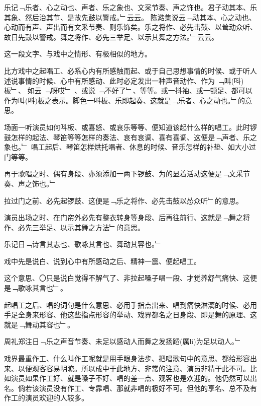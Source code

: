 \documentclass{zhvt-classic}
\begin{document}
\begin{preface}
  乐记﹁乐者、心之动也、声者、乐之象也、文采节奏、声之饰也。君子动其本、乐其象、然后治其节、是故先鼓以警戒。﹂云云。
  陈澔集说云﹁动其本、心之动也、心动而有声、声出而有文釆节奏、则乐饰矣。乐之将作、必先击鼓、以耸动众听、故日先鼓以警戒。舞之将作、必先三举足、以示其舞之方法。﹂云云。
\end{preface}

这一段文字、与戏中之情形、有极相似的地方。

比方戏中之起唱工、必系心内有所感触而起、或于自己思想事情的时候、或于听人述说事情的时候、心中有所感动、此时必定发出一种声音动作、作为 ﹁叫(呌)板﹂、 如云 ﹁呀哎﹂ 、或说 ﹁不好了﹂、等等。或一抖袖、或一顿足、都可以作为叫(呌)板之表示。脚色一呌板、乐即起奏、这就是﹁乐者、心之动也。﹂的意思。

场面一听演员如何呌板、或喜怒、或哀乐等等、便知道该起什么样的唱工。此时锣鼓怎样的起法、琴笛等等怎样的奏法、哀有哀调、喜有喜调、这便是﹁声者、乐之象也。﹂ 唱工起后、琴笛怎样烘托唱者、休息的时候、音乐怎样的补垫、如大小过门等等。

再于歌唱之时、偶有身段、亦须添加一两下锣鼓、为的显着活动这便是﹁文采节奏、声之饰也。﹂

拉过门之前、必先起锣鼓、这便是﹁乐之将作、必先击鼓以怂众听﹂的意思。

演员出场之时、在门帘外必先有整衣转身等身段、后再往前行、这就是﹁舞之将作、必先三举足、以示其舞之方法﹂的意思。

\begin{preface}
  乐记日﹁诗言其志也、歌咏其言也、舞动其容也。﹂
\end{preface}

戏中先是说白、说到心中有所感动之后、精神一震、便起唱工。

这个意思、〇只是说白觉得不解气了、非拉起嗓子唱一段、才觉养舒气痛快、这便是﹁歌咏其言也﹂。

起唱工之后、唱的词句是什么意思、必用手指点出来、唱到痛快淋漓的时候、必用手足全身来形容、他这些指点形容的举动、戏界都名之日身段、即是舞的原理、这就是﹁舞动其容也﹂。

\begin{preface}
  周礼郑注日﹁乐之声音节奏、未足以感动人而舞之发扬蹈(厲li)为足以动人。﹂
\end{preface}

戏界最重作工、什么叫作工呢就是用手眼身法步、把唱歌句中的意思、都给形容出来、以便观客容易明瞭。所以成中于此地方、非常的注意、演员非精于此不可。比如演员如果作工好、就是嗓子不好、唱的差一点、观客也是欢迎的。他仍然可以出名。倘若该演员没有作工、专靠唱、那就非唱的极好不可。但他的享名、总不及有作工的演员欢迎的人较多。
\end{document}
